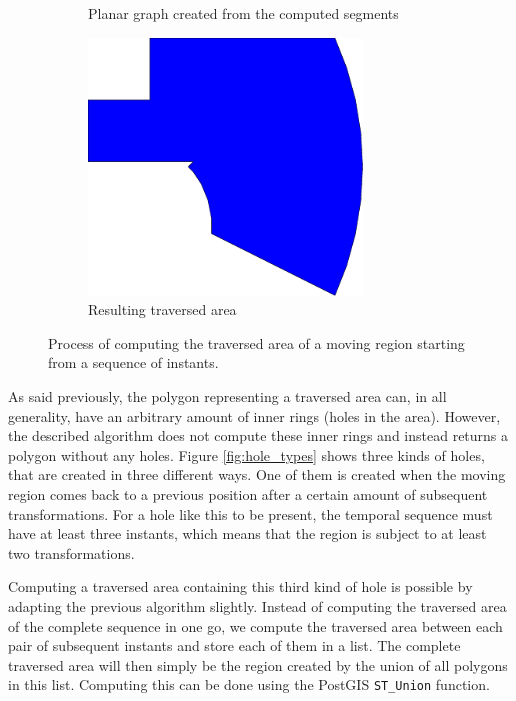 \begin{figure}[h!]
\begin{subfigure}{.3\textwidth}
        \caption{Planar graph created from the computed segments}
        \label{fig:planar_graph}
    \end{subfigure}
    \hfill
    \begin{subfigure}{.3\textwidth}
        \centering
        \includegraphics[width=0.8\textwidth]{images/process_traversed_area.pdf}
        \caption{Resulting traversed area}{}
    \end{subfigure}
    \caption[Process of computing the traversed area of a moving region]{Process of computing the traversed area of a moving region starting from a sequence of instants.}
    \label{fig:traversed_area_process}
\end{figure}

As said previously, the polygon representing a traversed area can, in all generality, have an arbitrary amount of inner rings (holes in the area). However, the described algorithm does not compute these inner rings and instead returns a polygon without any holes. Figure \ref{fig:hole_types} shows three kinds of holes, that are created in three different ways. One of them is created when the moving region comes back to a previous position after a certain amount of subsequent transformations. For a hole like this to be present, the temporal sequence must have at least three instants, which means that the region is subject to at least two transformations.

Computing a traversed area containing this third kind of hole is possible by adapting the previous algorithm slightly. Instead of computing the traversed area of the complete sequence in one go, we compute the traversed area between each pair of subsequent instants and store each of them in a list. The complete traversed area will then simply be the region created by the union of all polygons in this list. Computing this can be done using the PostGIS \lstinline{ST_Union} function.